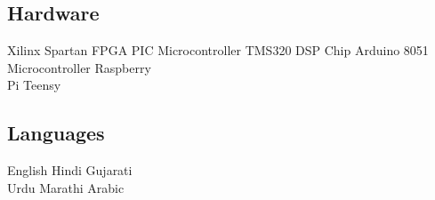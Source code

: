 \documentclass[]{deedy}
\begin{document}
\begin{minipage}[t]{0.27\textwidth}
\begin{flushleft}
\subsection{Hardware}
Xilinx Spartan FPGA \textbullet{} PIC Microcontroller \textbullet{} TMS320 DSP Chip \textbullet{} Arduino \textbullet{} 8051 Microcontroller \textbullet{} Raspberry\\
Pi \textbullet{} Teensy
%
\subsection{Languages}
English \textbullet{} Hindi \textbullet{} Gujarati \textbullet{}\\
Urdu \textbullet{} Marathi \textbullet{} Arabic
\sectionsep
%
\end{flushleft}
\end{minipage}
\hfill
%
\end{document}
